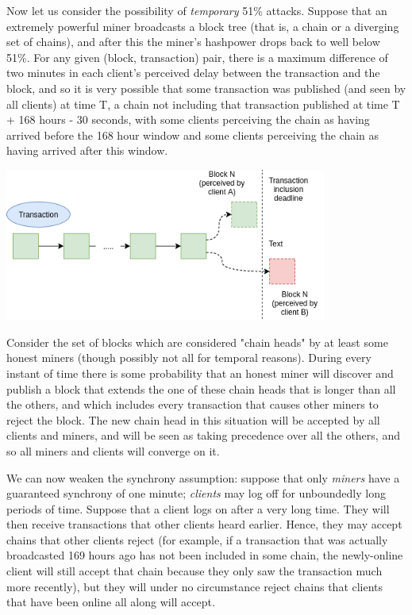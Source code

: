 \documentclass[12pt]{article}
\begin{document}
Now let us consider the possibility of \textit{temporary} 51\% attacks. Suppose that an extremely powerful miner broadcasts a block tree (that is, a chain or a diverging set of chains), and after this the miner's hashpower drops back to well below 51\%. For any given (block, transaction) pair, there is a maximum difference of two minutes in each client's perceived delay between the transaction and the block, and so it is very possible that some transaction was published (and seen by all clients) at time T, a chain not including that transaction published at time T + 168 hours - 30 seconds, with some clients perceiving the chain as having arrived before the 168 hour window and some clients perceiving the chain as having arrived after this window.

\includegraphics[width=400px]{Censorship4.png}

Consider the set of blocks which are considered "chain heads" by at least some honest miners (though possibly not all for temporal reasons). During every instant of time there is some probability that an honest miner will discover and publish a block that extends the one of these chain heads that is longer than all the others, and which includes every transaction that causes other miners to reject the block. The new chain head in this situation will be accepted by all clients and miners, and will be seen as taking precedence over all the others, and so all miners and clients will converge on it.

We can now weaken the synchrony assumption: suppose that only \textit{miners} have a guaranteed synchrony of one minute; \textit{clients} may log off for unboundedly long periods of time. Suppose that a client logs on after a very long time. They will then receive transactions that other clients heard earlier. Hence, they may accept chains that other clients reject (for example, if a transaction that was actually broadcasted 169 hours ago has not been included in some chain, the newly-online client will still accept that chain because they only saw the transaction much more recently), but they will under no circumstance reject chains that clients that have been online all along will accept.
\end{document}

